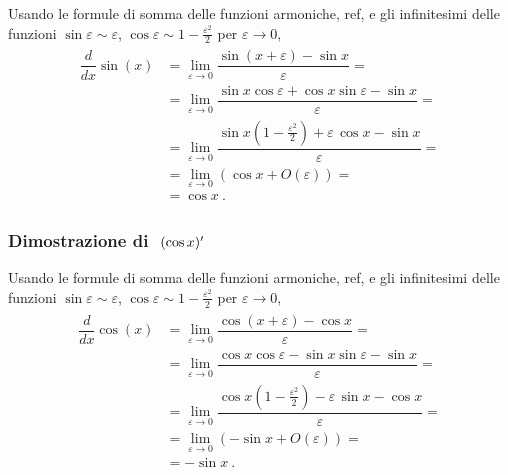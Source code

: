 \documentclass[letterpaper,10pt,italian]{jupyterBook}
\begin{document}
\sphinxAtStartPar
Usando le formule di somma delle funzioni armoniche,  ref, e gli infinitesimi delle funzioni \(\sin \varepsilon \sim \varepsilon\), \(\cos \varepsilon \sim 1 - \frac{\varepsilon^2}{2}\) per \(\varepsilon \rightarrow 0\),
\begin{equation*}
\begin{split}\begin{aligned}
  \dfrac{d}{dx} \sin(x) 
  & = \lim_{\varepsilon \rightarrow 0}  \dfrac{\sin(x+\varepsilon) - \sin x}{\varepsilon} = \\
  & = \lim_{\varepsilon \rightarrow 0} \dfrac{\sin x \cos \varepsilon + \cos x \sin \varepsilon - \sin x}{\varepsilon} = \\
  & = \lim_{\varepsilon \rightarrow 0} \dfrac{\sin x \left( 1 - \frac{\varepsilon^2}{2} \right) + \varepsilon \, \cos x - \sin x}{\varepsilon} = \\
  & = \lim_{\varepsilon \rightarrow 0} \left( \cos x + O(\varepsilon) \right) = \\
  & = \cos x \ .
\end{aligned}\end{split}
\end{equation*}\subsubsection*{Dimostrazione di \protect\(\ (\cos x)'\protect\)}

\sphinxAtStartPar
Usando le formule di somma delle funzioni armoniche,  ref, e gli infinitesimi delle funzioni \(\sin \varepsilon \sim \varepsilon\), \(\cos \varepsilon \sim 1 - \frac{\varepsilon^2}{2}\) per \(\varepsilon \rightarrow 0\),
\begin{equation*}
\begin{split}\begin{aligned}
  \dfrac{d}{dx} \cos(x) 
  & = \lim_{\varepsilon \rightarrow 0}  \dfrac{\cos(x+\varepsilon) - \cos x}{\varepsilon} = \\
  & = \lim_{\varepsilon \rightarrow 0} \dfrac{\cos x \cos \varepsilon - \sin x \sin \varepsilon - \sin x}{\varepsilon} = \\
  & = \lim_{\varepsilon \rightarrow 0} \dfrac{\cos x \left( 1 - \frac{\varepsilon^2}{2} \right) - \varepsilon \, \sin x - \cos x}{\varepsilon} = \\
  & = \lim_{\varepsilon \rightarrow 0} \left( - \sin x + O(\varepsilon) \right) = \\
  & = - \sin x \ .
\end{aligned}\end{split}
\end{equation*}
\end{document}

